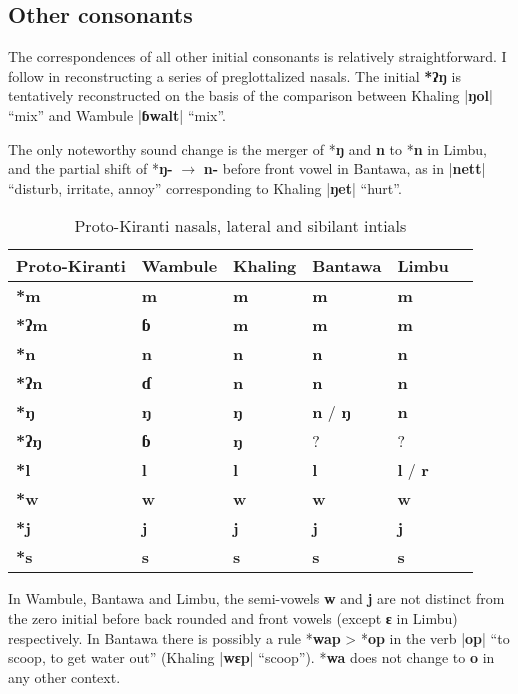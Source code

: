\documentclass[oldfontcommands,oneside,a4paper,11pt]{article}
\newcommand{\ipa}[1]{\textbf{{\phon\mbox{#1}}}} %
\newcommand{\dhatu}[2]{|\ipa{#1}| ``#2''}
\newcommand{\change}[2]{*\ipa{#1} $\rightarrow$ \ipa{#2}}
\begin{document}
\subsection{Other consonants}
The correspondences of all other initial consonants is relatively straightforward. I follow \citet{opgenort04implosives} in reconstructing a series of preglottalized nasals. The initial \ipa{*ʔŋ} is tentatively reconstructed on the basis of the comparison between Khaling \dhatu{ŋol}{mix} and Wambule \dhatu{ɓwalt}{mix}.

The only noteworthy sound change is the merger of *\ipa{ŋ} and \ipa{n} to *\ipa{n} in Limbu, and the partial shift of \change{ŋ-}{n-} before front vowel in Bantawa, as in \dhatu{nett}{disturb, irritate, annoy} corresponding to Khaling \dhatu{ŋet}{hurt}.

\begin{table}[H]
\caption{Proto-Kiranti nasals, lateral and sibilant intials} \centering \label{tab:nasals}
\begin{tabular}{llllll}
\toprule
Proto-Kiranti & Wambule & Khaling & Bantawa & Limbu \\
\midrule
\ipa{*m} & \ipa{m} & \ipa{m} & \ipa{m} & \ipa{m}  \\
\ipa{*ʔm} & \ipa{ɓ} & \ipa{m} & \ipa{m} & \ipa{m}  \\
\ipa{*n} & \ipa{n} & \ipa{n} & \ipa{n} & \ipa{n}  \\
\ipa{*ʔn} & \ipa{ɗ} & \ipa{n} & \ipa{n} & \ipa{n}  \\
\ipa{*ŋ} & \ipa{ŋ} & \ipa{ŋ} & \ipa{n} / \ipa{ŋ} & \ipa{n}  \\
\ipa{*ʔŋ} &  \ipa{ɓ}  & \ipa{ŋ} & ? &?  \\
\ipa{*l} & \ipa{l} & \ipa{l} & \ipa{l} & \ipa{l} / \ipa{r} \\
\ipa{*w} & \ipa{w} & \ipa{w} & \ipa{w} & \ipa{w} \\
\ipa{*j} & \ipa{j} & \ipa{j} & \ipa{j} & \ipa{j} \\
\ipa{*s} & \ipa{s} & \ipa{s} & \ipa{s} & \ipa{s}  \\
\bottomrule
\end{tabular}
\end{table}

In Wambule, Bantawa and Limbu, the semi-vowels \ipa{w} and \ipa{j} are not distinct from the zero initial before back rounded and front vowels (except \ipa{ɛ} in Limbu) respectively. In Bantawa there is possibly a rule *\ipa{wap} > *\ipa{op} in the verb \dhatu{op}{to scoop, to get water out} (Khaling \dhatu{wɛp}{scoop}). *\ipa{wa} does not change to \ipa{o} in any other context.
\end{document}

